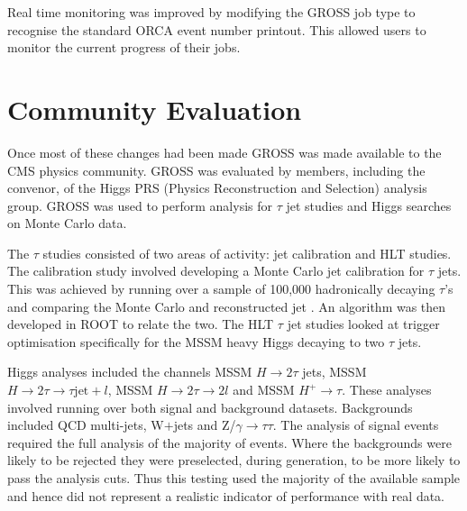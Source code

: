 Real time monitoring was improved by modifying the GROSS job type to recognise the standard ORCA event number printout. This allowed users to monitor the current progress of their jobs.


\section{Community Evaluation}
Once most of these changes had been made GROSS was made available to the CMS physics community. GROSS was evaluated by members, including the convenor, of the Higgs PRS (Physics Reconstruction and Selection) analysis group. GROSS was used to perform analysis for $\tau$ jet studies and Higgs searches on Monte Carlo data.

The $\tau$ studies consisted of two areas of activity: jet calibration and HLT studies. The calibration study involved developing a Monte Carlo jet \ET calibration for $\tau$ jets. This was achieved by running over a sample of 100,000 hadronically decaying $\tau$'s and comparing the Monte Carlo and reconstructed jet \ET. An algorithm was then developed in ROOT to relate the two. The HLT $\tau$ jet studies looked at trigger optimisation specifically for the MSSM heavy Higgs decaying to two $\tau$ jets.

Higgs analyses included the channels MSSM $H \rightarrow 2 \tau $ jets, MSSM $H \rightarrow 2 \tau \rightarrow \tau \textrm{jet} + l$, MSSM $H \rightarrow 2 \tau \rightarrow 2l$ and MSSM $H^{+} \rightarrow \tau$. These analyses involved running over both signal and background datasets. Backgrounds included QCD multi-jets, W$ + $jets and Z/$\gamma \rightarrow \tau \tau$. The analysis of signal events required the full analysis of the majority of events. Where the backgrounds were likely to be rejected they were preselected, during generation, to be more likely to pass the analysis cuts. Thus this testing used the majority of the available sample and hence did not represent a realistic indicator of performance with real data. 

